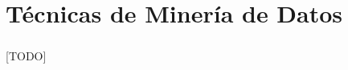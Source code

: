 \documentclass{subfiles}
\begin{document}
  \chapter{Técnicas de Minería de Datos}
  \label{chap:mining}

    \paragraph{}
    [TODO]
\end{document}
